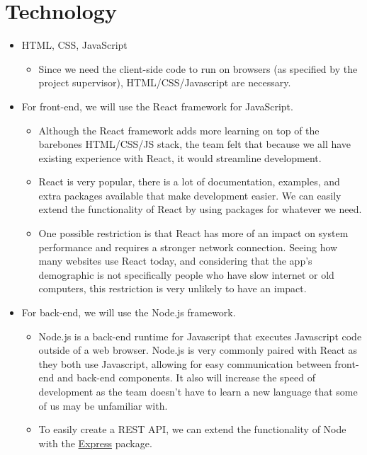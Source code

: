 \documentclass{article}
\begin{document}
\section{Technology}
\begin{itemize}
\item HTML, CSS, JavaScript
\begin{itemize}
    \item Since we need the client-side code to run on browsers (as specified by the project supervisor), HTML/CSS/Javascript are necessary.
\end{itemize}

\item For front-end, we will use the React framework for JavaScript. 
\begin{itemize}
    \item Although the React framework adds more learning on top of the barebones HTML/CSS/JS stack, the team felt that because we all have existing experience with React, it would streamline development. 
    
    \item React is very popular, there is a lot of documentation, examples, and extra packages available that make development easier. We can easily extend the functionality of React by using packages for whatever we need. 
    
    \item One possible restriction is that React has more of an impact on system performance and requires a stronger network connection. Seeing how many websites use React today, and considering that the app's demographic is not specifically people who have slow internet or old computers, this restriction is very unlikely to have an impact.
\end{itemize}

\item For back-end, we will use the Node.js framework.
\begin{itemize}
    \item Node.js is a back-end runtime for Javascript that executes Javascript code outside of a web browser. Node.js is very commonly paired with React as they both use Javascript, allowing for easy communication between front-end and back-end components. It also will increase the speed of development as the team doesn't have to learn a new language that some of us may be unfamiliar with.
    \item To easily create a REST API, we can extend the functionality of Node with the \href{https://expressjs.com/}{Express} package. 
\end{itemize}


\end{itemize}
\end{document}

